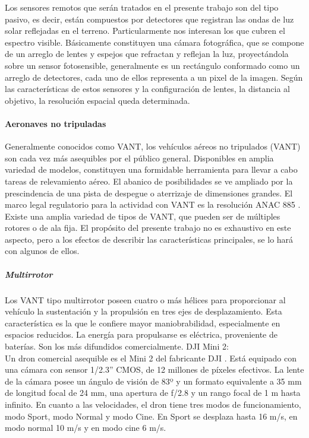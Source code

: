 Los sensores remotos que serán tratados en el presente trabajo son del tipo pasivo, es decir, están compuestos por detectores que registran las ondas de luz solar reflejadas en el terreno. Particularmente nos interesan los que cubren el espectro visible. Básicamente constituyen una cámara fotográfica, que se compone de un arreglo de lentes y espejos que refractan y reflejan la luz, proyectándola sobre un sensor fotosensible, generalmente es un rectángulo conformado como un arreglo de detectores, cada uno de ellos representa a un pixel de la imagen. Según las características de estos sensores y la configuración de lentes, la distancia al objetivo, la resolución espacial queda determinada. 


\paragraph{Aeronaves no tripuladas}
Generalmente conocidos como VANT, los vehículos aéreos no tripulados (VANT) son cada vez más asequibles por el público general. Disponibles en amplia variedad de modelos, constituyen una formidable herramienta para llevar a cabo tareas de relevamiento aéreo. El abanico de posibilidades se ve ampliado por la prescindencia de una pista de despegue o aterrizaje de dimensiones grandes. El marco legal regulatorio para la actividad con VANT es la resolución ANAC 885 \cite{noauthor_infoleg_nodate}.
Existe una amplia variedad de tipos de VANT, que pueden ser de múltiples rotores o de ala fija. El propósito del presente trabajo no es exhaustivo en este aspecto, pero a los efectos de describir las características principales, se lo hará con algunos de ellos.
\subparagraph{Multirrotor}
Los VANT tipo multirrotor poseen cuatro o más hélices para proporcionar al vehículo la sustentación y la propulsión en tres ejes de desplazamiento. Esta característica es la que le confiere mayor maniobrabilidad, especialmente en espacios reducidos. La energía para propulsarse es eléctrica, proveniente de baterías. Son los más difundidos comercialmente.
DJI Mini 2:\\
Un dron comercial asequible es el Mini 2 del fabricante DJI \cite{noauthor_dji_nodate-1}. Está equipado con una cámara con sensor 1/2.3” CMOS, de 12 millones de píxeles efectivos. La lente de la cámara posee un ángulo de visión de 83º y un formato equivalente a 35 mm de longitud focal de 24 mm, una apertura de f/2.8 y un rango focal de 1 m hasta infinito. En cuanto a las velocidades, el dron tiene tres modos de funcionamiento, modo Sport, modo Normal y modo Cine. En Sport se desplaza hasta 16 m/s, en modo normal 10 m/s y en modo cine 6 m/s.
